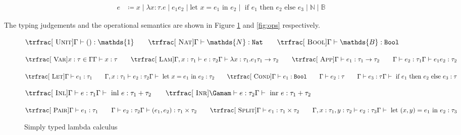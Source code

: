\documentclass[]{acmart}
\newcommand{\nat}{\texttt{Nat}}
\newcommand{\bool}{\texttt{Bool}}
\begin{document}
  \vspace*{-2em}
  \begin{align*}
    e &\coloneq x \mid \lambda x : \tau . e \mid e_{1} e_{2} \mid \text{let } x = e_1 \text{ in } e_2 \mid
                \text{ if } e_1 \text{ then } e_2 \text{ else } e_3 \mid \mathds{N} \mid \mathds{B}
  \end{align*}

  The typing judgements and the operational semantics are shown in Figure \ref{fig:stlc}
  and \ref{fig:ops} respectively.

  \begin{figure}
    \centering
    $
    \trfrac[~\textsc{Unit}]{}{\Gamma \vdash () : \mathds{1}}
      \qquad
    \trfrac[~\textsc{Nat}]{}{\Gamma \vdash \mathds{N} : \nat}
      \qquad
    \trfrac[~\textsc{Bool}]{}{\Gamma \vdash \mathds{B} : \bool}
    $\\
    \vspace*{1em}

    $\trfrac[~\textsc{Var}]{x : \tau \in \Gamma}{\Gamma \vdash x : \tau}
    \qquad
  \trfrac[~\textsc{Lam}]{\Gamma, x : \tau_1 \vdash e : \tau_2}{\Gamma \vdash \lambda x : \tau_1 . e_{1} \tau_{1} \rightarrow \tau_2}
    \qquad
  \trfrac[~\textsc{App}]{\Gamma \vdash e_1 : \tau_1 \rightarrow \tau_2 \qquad \Gamma \vdash e_{2} : \tau_1}{\Gamma \vdash e_{1} e_{2} : \tau_2}$ \\
  \vspace*{1em}

  $\trfrac[~\textsc{Let}]{\Gamma \vdash e_1 : \tau_1 \qquad \Gamma, x : \tau_1 \vdash e_2 : \tau_2}{\Gamma \vdash \text{ let } x = e_1 \text{ in } e_2 : \tau_2}
  \qquad
\trfrac[~\textsc{Cond}]{\Gamma \vdash e_1 : \bool \qquad \Gamma \vdash e_2 : \tau \qquad \Gamma \vdash e_3 : \tau}{\Gamma \vdash \text{ if } e_1 \text{ then } e_2 \text{ else } e_3 : \tau}$ \\
\vspace*{1em}

$
\trfrac[~\textsc{Inl}]{\Gamma \vdash e : \tau_1}{\Gamma \vdash \text{ inl } e : \tau_1 + \tau_2}
  \qquad
\trfrac[~\textsc{Inr}]{\Gamam \vdash e : \tau_2}{\Gamma \vdash \text{ inr } e : \tau_1 + \tau_2}
$\\
\vspace*{1em}

$\trfrac[~\textsc{Pair}]{\Gamma \vdash e_1 : \tau_1 \qquad \Gamma \vdash e_2 : \tau_2}{\Gamma \vdash (e_1, e_2) : \tau_1 \times \tau_2}
  \qquad
\trfrac[~\textsc{Split}]{\Gamma \vdash e_1 : \tau_1 \times \tau_2 \qquad \Gamma, x : \tau_1, y : \tau_2 \vdash e_2 : \tau_3}{\Gamma \vdash \text{ let } (x, y) = e_1 \text{ in } e_2 : \tau_3}$

    \caption{Simply typed lambda calculus}
    \label{fig:stlc}
  \end{figure}
\end{document}
